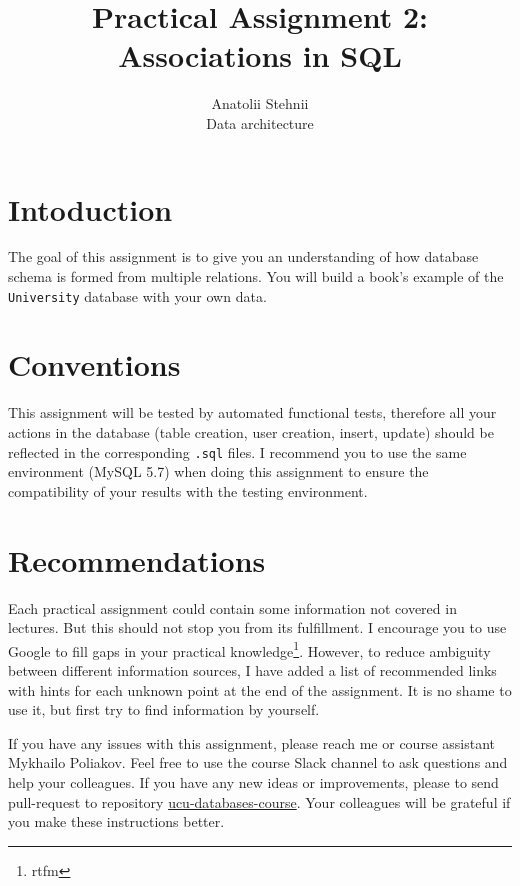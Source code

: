 \documentclass[12pt]{article}
\newcommand{\code}[1]{\texttt{#1}}
\begin{document}
\title{Practical Assignment 2: Associations in SQL}
\author{Anatolii Stehnii\\Data architecture}
\maketitle

\section*{Intoduction}
The goal of this assignment is to give you an understanding of how database schema is formed from multiple relations. You will build a book's example of the \code{University} database with your own data.

\section*{Conventions}

This assignment will be tested by automated functional tests, therefore all your  actions in the database (table creation, user creation, insert, update) should be reflected in the corresponding \code{.sql} files. I recommend you to use the same environment (MySQL 5.7) when doing this assignment to ensure the compatibility of your results with the testing environment.

\section*{Recommendations}

Each practical assignment could contain some information not covered in lectures. But this should not stop you from its fulfillment. I encourage you to use Google to fill gaps in your practical knowledge\footnote{rtfm}. However, to reduce ambiguity between different information sources, I have added a list of recommended links with hints for each unknown point at the end of the assignment. It is no shame to use it, but first try to find information by yourself.

If you have any issues with this assignment, please reach me or course assistant Mykhailo Poliakov. Feel free to use the course Slack channel to ask questions and help your colleagues. If you have any new ideas or improvements, please to send pull-request to repository \href{https://github.com/tsdaemon/ucu-databases-course}{ucu-databases-course}. Your colleagues will be grateful if you make these instructions better.
\end{document}
